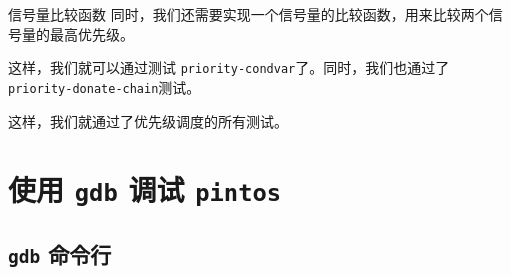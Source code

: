 \documentclass{beamer}
\begin{document}
\begin{frame}


  \begin{block}{信号量比较函数}
    同时，我们还需要实现一个信号量的比较函数，用来比较两个信号量的最高优先级。
  \end{block}

    

  \framebreak

  这样，我们就可以通过测试 \texttt{priority-condvar}了。同时，我们也通过了\texttt{priority-donate-chain}测试。

  \framebreak

  这样，我们就通过了优先级调度的所有测试。

\end{frame}

\section{使用 \texttt{gdb} 调试 \texttt{pintos}}

\subsection{\texttt{gdb} 命令行}
\end{document}
